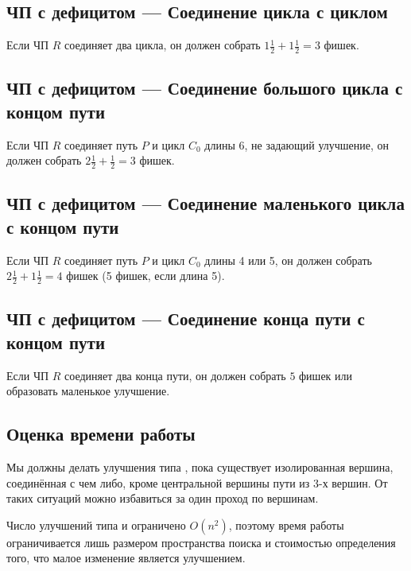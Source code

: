 \begin{proofstar}
\subsection{ЧП с дефицитом --- Соединение цикла с циклом}
\begin{stmt}
Если ЧП $R$ соединяет два цикла, он должен собрать $1\frac{1}{2} + 1\frac{1}{2} = 3$ фишек.
\end{stmt}

\subsection{ЧП с дефицитом --- Соединение большого цикла с концом пути}
\begin{stmt}
Если ЧП $R$ соединяет путь $P$ и цикл $C_0$ длины 6, не задающий улучшение, он должен собрать $2\frac{1}{2} + \frac{1}{2} = 3$ фишек.
\end{stmt}

\subsection{ЧП с дефицитом --- Соединение маленького цикла с концом пути}
\begin{stmt}
Если ЧП $R$ соединяет путь $P$ и цикл $C_0$ длины 4 или 5, он должен собрать $2\frac{1}{2} + 1\frac{1}{2} = 4$ фишек (5 фишек, если длина 5).
\end{stmt}

\subsection{ЧП с дефицитом --- Соединение конца пути с концом пути}
\begin{stmt}
Если ЧП $R$ соединяет два конца пути, он должен собрать $5$ фишек или образовать маленькое улучшение.
\end{stmt}

\subsection{Оценка времени работы}
Мы должны делать улучшения типа , пока существует изолированная вершина, соединённая с чем либо, кроме центральной вершины пути из 3-х вершин. От таких ситуаций можно избавиться за один проход по вершинам.

Число улучшений типа  и  ограничено $O(n^2)$, поэтому время работы ограничивается лишь размером пространства поиска и стоимостью определения того, что малое изменение является улучшением.


\end{proofstar}
